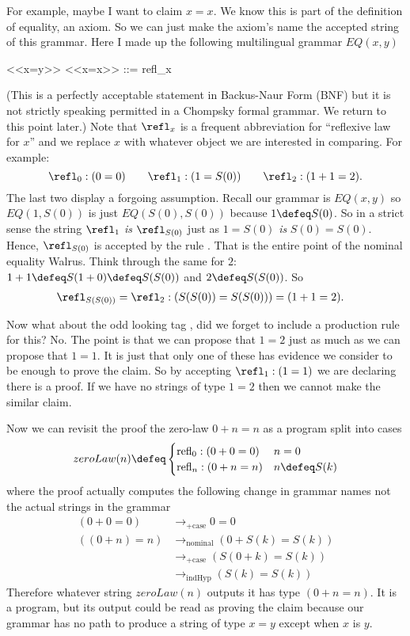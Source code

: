 For example, maybe I want to claim $x=x$.  We know 
this is part of the definition of equality, 
an axiom.  So we can just make the axiom's name the accepted 
string of this grammar.  Here I made up the following 
multilingual grammar $EQ(x,y)$
\begin{center}
\begin{Gcode}
<<x=y>>
<<x=x>> ::= refl_x
\end{Gcode}
\end{center}
(This is a perfectly acceptable statement in Backus-Naur Form (BNF) 
but it is not strictly speaking permitted in a Chompsky formal grammar.
We return to this point later.)
Note that $\refl_x$ is a frequent abbreviation for ``reflexive law for $x$''
and we replace $x$ with whatever object we are interested in comparing.
For example:
\[
    \refl_0:(0=0)\qquad \refl_{1}:(1=S(0))
    \qquad \refl_{2}:(1+1=2).
\]
The last two display a forgoing assumption.
Recall our grammar is $EQ(x,y)$ so $EQ(1,S(0))$ is just $EQ(S(0),S(0))$ 
because $1\defeq S(0)$.  So in a strict sense
the string $\refl_1$ \emph{is} $\refl_{S(0)}$ just as $1=S(0)$ \emph{is}
$S(0)=S(0)$. Hence, $\refl_{S(0)}$ is accepted by the 
rule .  That is the entire point of the 
nominal equality Walrus.  Think through the same for $2$:
$1+1\defeq S(1+0)\defeq S(S(0))$ and $2\defeq S(S(0))$.  So 
\begin{align*}
    \refl_{S(S(0))} =\refl_2 & : (S(S(0))=S(S(0))) = (1+1=2).
\end{align*}


Now what about the odd looking tag , did we forget 
to include a production rule for this?  No.  The point is that 
we can propose that $1=2$ just as much as we can propose that $1=1$.
It is just that only one of these has evidence we consider to be 
enough to prove the claim.  So by accepting $\refl_1:(1=1)$ we 
are declaring there is a proof.  If we have no strings of type $1=2$ 
then we cannot make the similar claim.

Now we can revisit the proof the zero-law $0+n=n$ as a program 
split into cases
\[
    zeroLaw(n) \defeq \begin{cases}
        \text{refl}_0:(0+0=0) & n=0\\
        \text{refl}_n:(0+n=n) & n\defeq S(k)
    \end{cases}
\]
where the proof actually computes the following change in grammar names
not the actual strings in the grammar
\begin{align*}
    (0+0=0) & \longrightarrow_{+\text{case}} 0=0\\
    ((0+n)=n) & \longrightarrow_{\text{nominal}}  (0+S(k)=S(k))\\
     & \longrightarrow_{+\text{case}} (S(0+k)=S(k))\\
     & \longrightarrow_{\text{indHyp}} (S(k)=S(k))
\end{align*}
Therefore whatever string $zeroLaw(n)$ outputs it has type $(0+n=n)$.
It is a program, but its output could be read as proving the claim because 
our grammar has no path to produce a string of type $x=y$ except when $x$ is $y$.


